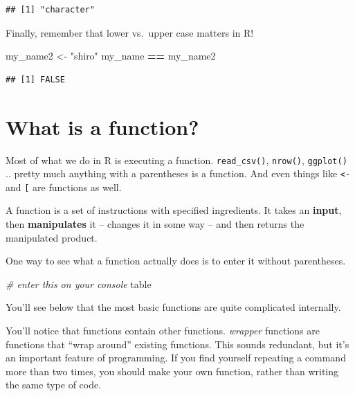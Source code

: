 \documentclass[]{book}
\newenvironment{Shaded}{\begin{snugshade}}{\end{snugshade}}
\newcommand{\CommentTok}[1]{\textcolor[rgb]{0.56,0.35,0.01}{\textit{#1}}}
\newcommand{\NormalTok}[1]{#1}
\newcommand{\OperatorTok}[1]{\textcolor[rgb]{0.81,0.36,0.00}{\textbf{#1}}}
\newcommand{\StringTok}[1]{\textcolor[rgb]{0.31,0.60,0.02}{#1}}
\theoremstyle{definition}
\theoremstyle{definition}
\theoremstyle{definition}
\theoremstyle{remark}
\begin{document}
\begin{Shaded}
\begin{Highlighting}[]
\begin{Shaded}
\begin{Highlighting}[]
\begin{Shaded}
\begin{Highlighting}[]
\begin{verbatim}
## [1] "character"
\end{verbatim}

Finally, remember that lower vs.~upper case matters in R!

\begin{Shaded}
\begin{Highlighting}[]
\NormalTok{my_name2 <-}\StringTok{ "shiro"}
\NormalTok{my_name }\OperatorTok{==}\StringTok{ }\NormalTok{my_name2}
\end{Highlighting}
\end{Shaded}

\begin{verbatim}
## [1] FALSE
\end{verbatim}

\hypertarget{what-is-a-function}{%
\section{What is a function?}\label{what-is-a-function}}

Most of what we do in R is executing a function. \texttt{read\_csv()}, \texttt{nrow()}, \texttt{ggplot()} .. pretty much anything with a parentheses is a function. And even things like \texttt{\textless{}-} and \texttt{{[}} are functions as well.

A function is a set of instructions with specified ingredients. It takes an \textbf{input}, then \textbf{manipulates} it -- changes it in some way -- and then returns the manipulated product.

One way to see what a function actually does is to enter it without parentheses.

\begin{Shaded}
\begin{Highlighting}[]
\CommentTok{# enter this on your console}
\NormalTok{table}
\end{Highlighting}
\end{Shaded}

You'll see below that the most basic functions are quite complicated internally.

You'll notice that functions contain other functions. \emph{wrapper} functions are functions that ``wrap around'' existing functions. This sounds redundant, but it's an important feature of programming. If you find yourself repeating a command more than two times, you should make your own function, rather than writing the same type of code.

\hypertarget{write-your-own-function}{%
}
\end{Highlighting}
\end{Shaded}
\end{Highlighting}
\end{Shaded}
\end{Highlighting}
\end{Shaded}
\end{document}

